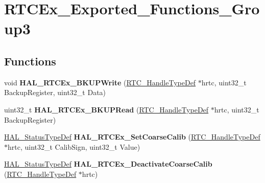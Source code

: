 \hypertarget{group___r_t_c_ex___exported___functions___group3}{}\section{R\+T\+C\+Ex\+\_\+\+Exported\+\_\+\+Functions\+\_\+\+Group3}
\label{group___r_t_c_ex___exported___functions___group3}
\subsection*{Functions}
\begin{DoxyCompactItemize}
\item 
void {\bfseries H\+A\+L\+\_\+\+R\+T\+C\+Ex\+\_\+\+B\+K\+U\+P\+Write} (\hyperlink{struct_r_t_c___handle_type_def}{R\+T\+C\+\_\+\+Handle\+Type\+Def} $\ast$hrtc, uint32\+\_\+t Backup\+Register, uint32\+\_\+t Data)\hypertarget{group___r_t_c_ex___exported___functions___group3_gafb908a2f254ccff959c31ac70e957de4}{}\label{group___r_t_c_ex___exported___functions___group3_gafb908a2f254ccff959c31ac70e957de4}

\item 
uint32\+\_\+t {\bfseries H\+A\+L\+\_\+\+R\+T\+C\+Ex\+\_\+\+B\+K\+U\+P\+Read} (\hyperlink{struct_r_t_c___handle_type_def}{R\+T\+C\+\_\+\+Handle\+Type\+Def} $\ast$hrtc, uint32\+\_\+t Backup\+Register)\hypertarget{group___r_t_c_ex___exported___functions___group3_ga37ba612da141a2b443bf64210f981513}{}\label{group___r_t_c_ex___exported___functions___group3_ga37ba612da141a2b443bf64210f981513}

\item 
\hyperlink{stm32f4xx__hal__def_8h_a63c0679d1cb8b8c684fbb0632743478f}{H\+A\+L\+\_\+\+Status\+Type\+Def} {\bfseries H\+A\+L\+\_\+\+R\+T\+C\+Ex\+\_\+\+Set\+Coarse\+Calib} (\hyperlink{struct_r_t_c___handle_type_def}{R\+T\+C\+\_\+\+Handle\+Type\+Def} $\ast$hrtc, uint32\+\_\+t Calib\+Sign, uint32\+\_\+t Value)\hypertarget{group___r_t_c_ex___exported___functions___group3_ga0f77700814ccfaa7a10969012ad92968}{}\label{group___r_t_c_ex___exported___functions___group3_ga0f77700814ccfaa7a10969012ad92968}

\item 
\hyperlink{stm32f4xx__hal__def_8h_a63c0679d1cb8b8c684fbb0632743478f}{H\+A\+L\+\_\+\+Status\+Type\+Def} {\bfseries H\+A\+L\+\_\+\+R\+T\+C\+Ex\+\_\+\+Deactivate\+Coarse\+Calib} (\hyperlink{struct_r_t_c___handle_type_def}{R\+T\+C\+\_\+\+Handle\+Type\+Def} $\ast$hrtc)\hypertarget{group___r_t_c_ex___exported___functions___group3_ga7803f69ddb68e220dd2b263e523bcdce}{}\label{group___r_t_c_ex___exported___functions___group3_ga7803f69ddb68e220dd2b263e523bcdce}


\end{DoxyCompactItemize}
